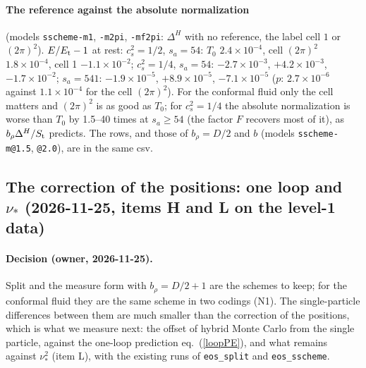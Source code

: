 \documentclass[11pt,aps,preprint,nofootinbib,superscriptaddress,tightenlines]{revtex4-2}
\def\Eq#1{eq.~(\ref{#1})}
\let\oldparagraph\paragraph
\renewcommand{\paragraph}{\par\bigskip\oldparagraph}
\begin{document}
\paragraph{The reference against the absolute normalization} (models \texttt{sscheme-m1}, \texttt{-m2pi}, \texttt{-mf2pi}: $\Delta^H$ with no
reference, the label cell $1$ or $(2\pi)^2$).  $E/E_{\rm t}-1$ at rest: $c_s^2=1/2$, $s_a=54$: $T_0$ $2.4\times10^{-4}$, cell $(2\pi)^2$
$1.8\times10^{-4}$, cell 1 $-1.1\times10^{-2}$; $c_s^2=1/4$, $s_a=54$: $-2.7\times10^{-3}$, $+4.2\times10^{-3}$, $-1.7\times10^{-2}$; $s_a=541$:
$-1.9\times10^{-5}$, $+8.9\times10^{-5}$, $-7.1\times10^{-5}$ ($p$: $2.7\times10^{-6}$ against $1.1\times10^{-4}$ for the cell $(2\pi)^2$).  For the
conformal fluid only the cell matters and $(2\pi)^2$ is as good as $T_0$; for $c_s^2=1/4$ the absolute normalization is worse than $T_0$ by
1.5--40 times at $s_a\ge54$ (the factor $F$ recovers most of it), as $b_\rho\Delta^H/S_{\rm t}$ predicts.  The rows, and those of $b_\rho=D/2$ and $b$
(models \texttt{sscheme-m@1.5}, \texttt{@2.0}), are in the same csv.


\subsection*{The correction of the positions: one loop and $\nu_*$ (2026-11-25, items H and L on the level-1 data)}

\paragraph{Decision (owner, 2026-11-25).}  Split and the measure form with $b_\rho=D/2+1$ are the schemes to keep; for the conformal fluid they are
the same scheme in two codings (N1).  The single-particle differences between them are much smaller than the correction of the positions, which is
what we measure next: the offset of hybrid Monte Carlo from the single particle, against the one-loop prediction \Eq{loopPE}, and what remains
against $\nu_*^2$ (item L), with the existing runs of \texttt{eos\_split} and \texttt{eos\_sscheme}.
\end{document}
